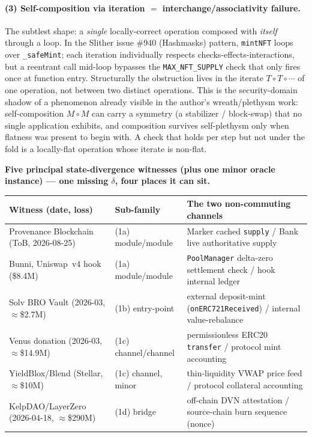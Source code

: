 \documentclass[11pt]{amsart}
\theoremstyle{definition}
\theoremstyle{remark}
\begin{document}
\paragraph{(3) Self-composition via iteration $=$ interchange/associativity failure.}
The subtlest shape: a \emph{single} locally-correct operation composed with \emph{itself} through
a loop. In the Slither issue \#940 (Hashmasks) pattern, \texttt{mintNFT} loops over
\texttt{\_safeMint}; each iteration individually respects checks-effects-interactions, but a
reentrant call mid-loop bypasses the \texttt{MAX\_NFT\_SUPPLY} check that only fires once at
function entry. Structurally the obstruction lives in the iterate $T\circ T\circ\cdots$ of one
operation, not between two distinct operations. This is the security-domain shadow of a phenomenon
already visible in the author's wreath/plethysm work: self-composition $M\circ M$ can carry a
symmetry (a stabilizer / block-swap) that no single application exhibits, and composition survives
self-plethysm only when flatness was present to begin with. A check that holds per step but not
under the fold is a locally-flat operation whose iterate is non-flat.

\begin{center}
\small
\textbf{Five principal state-divergence witnesses (plus one minor oracle instance) --- one missing
$\delta$, four places it can sit.}\\[2pt]
\begin{tabular}{@{}p{4.0cm}p{2.5cm}p{6.4cm}@{}}
\toprule
\textbf{Witness (date, loss)} & \textbf{Sub-family} & \textbf{The two non-commuting channels}\\
\midrule
Provenance Blockchain (ToB, 2026-08-25) & (1a) module/module &
  Marker cached \texttt{supply} / Bank live authoritative supply\\
\addlinespace
Bunni, Uniswap~v4 hook (\$8.4M) & (1a) module/module &
  \texttt{PoolManager} delta-zero settlement check / hook internal ledger\\
\addlinespace
Solv BRO Vault (2026-03, $\approx$\$2.7M) & (1b) entry-point &
  external deposit-mint (\texttt{onERC721Received}) / internal value-rebalance\\
\addlinespace
Venus donation (2026-03, $\approx$\$14.9M) & (1c) channel/channel &
  permissionless ERC20 \texttt{transfer} / protocol mint accounting\\
\addlinespace
YieldBlox/Blend (Stellar, $\approx$\$10M) & (1c) channel, minor &
  thin-liquidity VWAP price feed / protocol collateral accounting\\
\addlinespace
KelpDAO/LayerZero (2026-04-18, $\approx$\$290M) & (1d) bridge &
  off-chain DVN attestation / source-chain burn sequence (nonce)\\
\bottomrule
\end{tabular}
\end{center}
\end{document}
